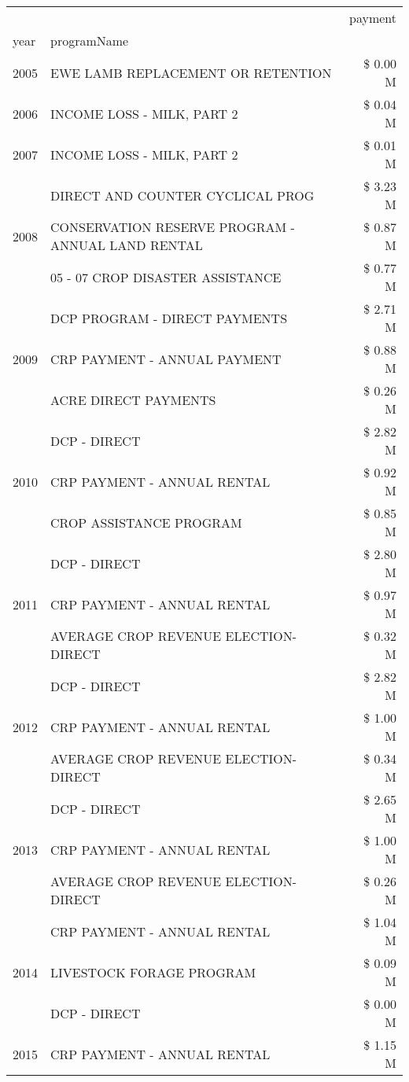 \begin{tabular}{llr}
\toprule
 &  & payment \\
year & programName &  \\
\midrule
2005 & EWE LAMB REPLACEMENT OR RETENTION & \$ 0.00 M \\
\cline{1-3}
2006 & INCOME LOSS - MILK, PART 2 & \$ 0.04 M \\
\cline{1-3}
2007 & INCOME LOSS - MILK, PART 2 & \$ 0.01 M \\
\cline{1-3}
\multirow[t]{3}{*}{2008} & DIRECT AND COUNTER CYCLICAL PROG & \$ 3.23 M \\
 & CONSERVATION RESERVE PROGRAM - ANNUAL LAND RENTAL & \$ 0.87 M \\
 & 05 - 07 CROP DISASTER ASSISTANCE & \$ 0.77 M \\
\cline{1-3}
\multirow[t]{3}{*}{2009} & DCP PROGRAM - DIRECT PAYMENTS & \$ 2.71 M \\
 & CRP PAYMENT - ANNUAL PAYMENT & \$ 0.88 M \\
 & ACRE DIRECT PAYMENTS & \$ 0.26 M \\
\cline{1-3}
\multirow[t]{3}{*}{2010} & DCP - DIRECT & \$ 2.82 M \\
 & CRP PAYMENT - ANNUAL RENTAL & \$ 0.92 M \\
 & CROP ASSISTANCE PROGRAM & \$ 0.85 M \\
\cline{1-3}
\multirow[t]{3}{*}{2011} & DCP - DIRECT & \$ 2.80 M \\
 & CRP PAYMENT - ANNUAL RENTAL & \$ 0.97 M \\
 & AVERAGE CROP REVENUE ELECTION-DIRECT & \$ 0.32 M \\
\cline{1-3}
\multirow[t]{3}{*}{2012} & DCP - DIRECT & \$ 2.82 M \\
 & CRP PAYMENT - ANNUAL RENTAL & \$ 1.00 M \\
 & AVERAGE CROP REVENUE ELECTION-DIRECT & \$ 0.34 M \\
\cline{1-3}
\multirow[t]{3}{*}{2013} & DCP - DIRECT & \$ 2.65 M \\
 & CRP PAYMENT - ANNUAL RENTAL & \$ 1.00 M \\
 & AVERAGE CROP REVENUE ELECTION-DIRECT & \$ 0.26 M \\
\cline{1-3}
\multirow[t]{3}{*}{2014} & CRP PAYMENT - ANNUAL RENTAL & \$ 1.04 M \\
 & LIVESTOCK FORAGE PROGRAM & \$ 0.09 M \\
 & DCP - DIRECT & \$ 0.00 M \\
\cline{1-3}
\multirow[t]{3}{*}{2015} & CRP PAYMENT - ANNUAL RENTAL & \$ 1.15 M \\

\end{tabular}
